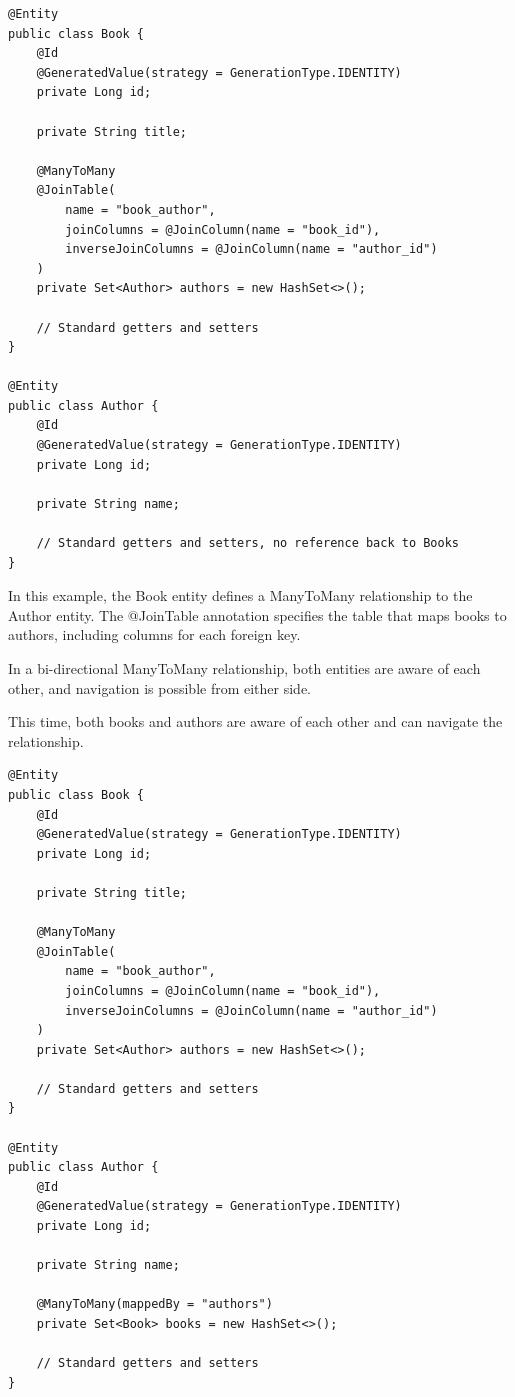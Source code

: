 \begin{lstlisting}
@Entity
public class Book {
    @Id
    @GeneratedValue(strategy = GenerationType.IDENTITY)
    private Long id;

    private String title;

    @ManyToMany
    @JoinTable(
        name = "book_author",
        joinColumns = @JoinColumn(name = "book_id"),
        inverseJoinColumns = @JoinColumn(name = "author_id")
    )
    private Set<Author> authors = new HashSet<>();

    // Standard getters and setters
}

@Entity
public class Author {
    @Id
    @GeneratedValue(strategy = GenerationType.IDENTITY)
    private Long id;

    private String name;

    // Standard getters and setters, no reference back to Books
}
\end{lstlisting}
In this example, the Book entity defines a ManyToMany relationship to the Author entity. The @JoinTable annotation specifies the table that maps books to authors, including columns for each foreign key.


In a bi-directional ManyToMany relationship, both entities are aware of each other, and navigation is possible from either side.

This time, both books and authors are aware of each other and can navigate the relationship.

\begin{lstlisting}
@Entity
public class Book {
    @Id
    @GeneratedValue(strategy = GenerationType.IDENTITY)
    private Long id;

    private String title;

    @ManyToMany
    @JoinTable(
        name = "book_author",
        joinColumns = @JoinColumn(name = "book_id"),
        inverseJoinColumns = @JoinColumn(name = "author_id")
    )
    private Set<Author> authors = new HashSet<>();

    // Standard getters and setters
}

@Entity
public class Author {
    @Id
    @GeneratedValue(strategy = GenerationType.IDENTITY)
    private Long id;

    private String name;

    @ManyToMany(mappedBy = "authors")
    private Set<Book> books = new HashSet<>();

    // Standard getters and setters
}
\end{lstlisting}


